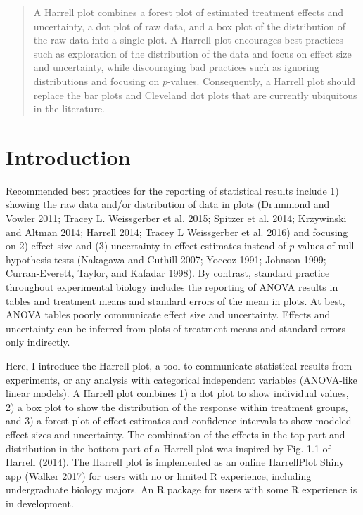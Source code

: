 \documentclass[]{article}
\author[1,2]{Jeffrey A. Walker}
\affil[1]{walker@maine.edu}
\affil[2]{Department of Biological Sciences, University of Southern Maine, 70 Falmouth Street, Portland, ME 04103}
\date{1 April 2018}
\theoremstyle{definition}
\theoremstyle{definition}
\theoremstyle{definition}
\theoremstyle{remark}
\begin{document}
\maketitle
\begin{abstract}
A Harrell plot combines a forest plot of estimated treatment effects and
uncertainty, a dot plot of raw data, and a box plot of the distribution
of the raw data into a single plot. A Harrell plot encourages best
practices such as exploration of the distribution of the data and focus
on effect size and uncertainty, while discouraging bad practices such as
ignoring distributions and focusing on \(p\)-values. Consequently, a
Harrell plot should replace the bar plots and Cleveland dot plots that
are currently ubiquitous in the literature.
\end{abstract}


\section*{Introduction}\label{introduction}

Recommended best practices for the reporting of statistical results
include 1) showing the raw data and/or distribution of data in plots
(Drummond and Vowler 2011; Tracey L. Weissgerber et al. 2015; Spitzer et
al. 2014; Krzywinski and Altman 2014; Harrell 2014; Tracey L Weissgerber
et al. 2016) and focusing on 2) effect size and (3) uncertainty in
effect estimates instead of \(p\)-values of null hypothesis tests
(Nakagawa and Cuthill 2007; Yoccoz 1991; Johnson 1999; Curran-Everett,
Taylor, and Kafadar 1998). By contrast, standard practice throughout
experimental biology includes the reporting of ANOVA results in tables
and treatment means and standard errors of the mean in plots. At best,
ANOVA tables poorly communicate effect size and uncertainty. Effects and
uncertainty can be inferred from plots of treatment means and standard
errors only indirectly.

Here, I introduce the Harrell plot, a tool to communicate statistical
results from experiments, or any analysis with categorical independent
variables (ANOVA-like linear models). A Harrell plot combines 1) a dot
plot to show individual values, 2) a box plot to show the distribution
of the response within treatment groups, and 3) a forest plot of effect
estimates and confidence intervals to show modeled effect sizes and
uncertainty. The combination of the effects in the top part and
distribution in the bottom part of a Harrell plot was inspired by Fig.
1.1 of Harrell (2014). The Harrell plot is implemented as an online
\href{https://middleprofessor.shinyapps.io/HarrellPlot/}{HarrellPlot
Shiny app} (Walker 2017) for users with no or limited R experience,
including undergraduate biology majors. An R package for users with some
R experience is in development.
\end{document}
